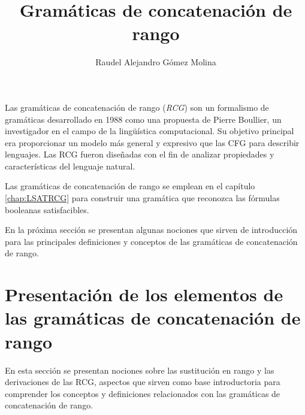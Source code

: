 \documentclass[12pt]{article}
\title{Gramáticas de concatenación de rango}
\author{Raudel Alejandro Gómez Molina}
\begin{document}
\maketitle






Las gramáticas de concatenación de rango (\textit{RCG}) \cite{mainRCGBib} son un formalismo de gramáticas desarrollado
en 1988 como una propuesta de Pierre Boullier, un investigador en el campo de la lingüística computacional. Su
objetivo principal era proporcionar un modelo más general y expresivo que las CFG para describir lenguajes.
Las RCG fueron diseñadas con el fin de analizar propiedades y características del lenguaje natural.

Las gramáticas de concatenación de rango se emplean en el capítulo \ref{chap:LSATRCG} para construir una gramática que 
reconozca las fórmulas booleanas satisfacibles. 

En la próxima sección se presentan algunas nociones que sirven de introducción para las principales definiciones y conceptos
de las gramáticas de concatenación de rango.

\section{Presentación de los elementos de las gramáticas de concatenación de rango}

En esta sección se presentan nociones sobre las sustitución en rango y las derivaciones de las RCG, aspectos que sirven como base introductoria para comprender los 
conceptos y definiciones relacionados con las gramáticas de concatenación de rango.
\end{document}
